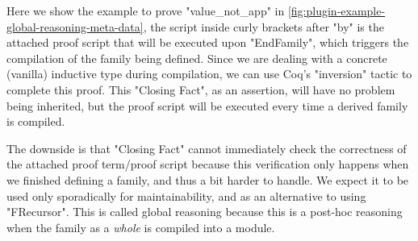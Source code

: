 
Here we show the example to prove "value_not_app" in
\cref{fig:plugin-example-global-reasoning-meta-data}, the script inside
curly brackets after "by" is the attached proof script that will be
executed upon "EndFamily", which triggers the compilation of the family
being defined.
Since we are dealing with a concrete (vanilla) inductive type during compilation,
we can use Coq's "inversion" tactic to complete this proof.
This "Closing Fact", as an assertion, will have no problem being
inherited, but the proof script will be executed every time a derived
family is compiled.

The downside is that "Closing Fact" cannot immediately check the correctness of the
attached proof term/proof script because this verification only happens when we
finished defining a family, and thus a bit harder to handle.
We expect it to be used only sporadically for maintainability, and as an alternative to using "FRecursor". This is called global reasoning because this is a post-hoc reasoning when the family as a \textit{whole} is compiled into a module.




